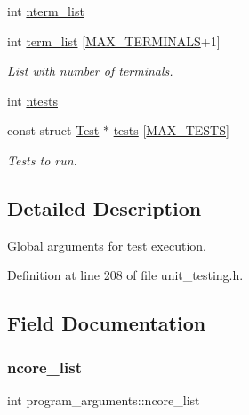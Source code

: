 \begin{DoxyCompactItemize}
int \hyperlink{structprogram__arguments_a48fbd16e4ce7ab5438078817c4931108}{nterm\+\_\+list}
\item 
\mbox{\label{structprogram__arguments_ab05abd5478458bb551479eb3e3dc75b1}} 
int \hyperlink{structprogram__arguments_ab05abd5478458bb551479eb3e3dc75b1}{term\+\_\+list} \mbox{[}\hyperlink{bios_8h_a4e7d162c7c35103b42768ff4a5c73905}{M\+A\+X\+\_\+\+T\+E\+R\+M\+I\+N\+A\+LS}+1\mbox{]}
\begin{DoxyCompactList}\small\item\em List with number of terminals. \end{DoxyCompactList}\item 
int \hyperlink{structprogram__arguments_a8b96bf14afced6bae0d45424ab2fac57}{ntests}
\item 
\mbox{\label{structprogram__arguments_a1db9e2ccc5b4309d559617d2b327e527}} 
const struct \hyperlink{structTest}{Test} $\ast$ \hyperlink{structprogram__arguments_a1db9e2ccc5b4309d559617d2b327e527}{tests} \mbox{[}\hyperlink{group__Testing_ga2a77d2f2c5b698c69c19e1f8782bf709}{M\+A\+X\+\_\+\+T\+E\+S\+TS}\mbox{]}
\begin{DoxyCompactList}\small\item\em Tests to run. \end{DoxyCompactList}\end{DoxyCompactItemize}


\subsection{Detailed Description}
Global arguments for test execution. 

Definition at line 208 of file unit\+\_\+testing.\+h.



\subsection{Field Documentation}
\mbox{\label{structprogram__arguments_ab9717e16b92f14aa8c54dbf4a2d2b7b1}} 
\subsubsection{\texorpdfstring{ncore\+\_\+list}{ncore\_list}}
{\footnotesize\ttfamily int program\+\_\+arguments\+::ncore\+\_\+list}

